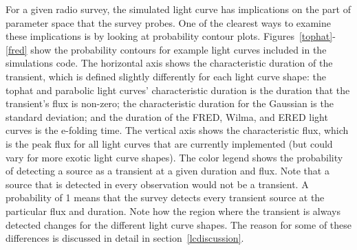 \documentclass[12pt]{article}
\begin{document}
For a given radio survey, the simulated light curve has implications on the part of parameter space that the survey probes. One of the clearest ways to examine these implications is by looking at probability contour plots. Figures~\ref{tophat}-\ref{fred} show the probability contours for example light curves included in the simulations code. The horizontal axis shows the characteristic duration of the transient, which is defined slightly differently for each light curve shape: the tophat and parabolic light curves' characteristic duration is the duration that the transient's flux is non-zero; the characteristic duration for the Gaussian is the standard deviation; and the duration of the FRED, Wilma, and ERED light curves is the e-folding time. The vertical axis shows the characteristic flux, which is the peak flux for all light curves that are currently implemented (but could vary for more exotic light curve shapes). The color legend shows the probability of detecting a source as a transient at a given duration and flux. Note that a source that is detected in every observation would not be a transient. A probability of 1 means that the survey detects every transient source at the particular flux and duration. Note how the region where the transient is always detected changes for the different light curve shapes. The reason for some of these differences is discussed in detail in section~\ref{lcdiscussion}.
\end{document}
